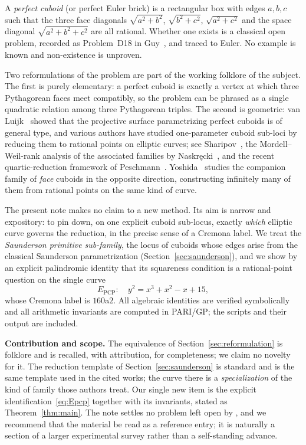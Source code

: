 \documentclass[11pt,reqno]{amsart}
\theoremstyle{plain}
\theoremstyle{definition}
\newcommand{\Epcp}{E_{\mathrm{PCP}}}
\begin{document}
A \emph{perfect cuboid} (or perfect Euler brick) is a rectangular box with
edges $a,b,c$ such that the three face diagonals $\sqrt{a^2+b^2}$,
$\sqrt{b^2+c^2}$, $\sqrt{a^2+c^2}$ and the space diagonal
$\sqrt{a^2+b^2+c^2}$ are all rational. Whether one exists is a classical open
problem, recorded as Problem~D18 in Guy~\cite{Guy}, and traced to Euler. No
example is known and non-existence is unproven.

Two reformulations of the problem are part of the working folklore of the
subject. The first is purely elementary: a perfect cuboid is exactly a vertex
at which three Pythagorean faces meet compatibly, so the problem can be phrased
as a single quadratic relation among three Pythagorean triples. The second is
geometric: van Luijk~\cite{vanLuijk} showed that the projective surface
parametrizing perfect cuboids is of general type, and various authors have
studied one-parameter cuboid sub-loci by reducing them to rational points on
elliptic curves; see Sharipov~\cite{Sharipov2elliptic}, the
Mordell--Weil-rank analysis of the associated families by
Naskr\k{e}cki~\cite{Naskrecki}, and the recent quartic-reduction framework of
Peschmann~\cite{Peschmann1,Peschmann2}. Yoshida~\cite{Yoshida} studies the
companion family of \emph{face} cuboids in the opposite direction, constructing
infinitely many of them from rational points on the same kind of curve.

The present note makes no claim to a new method. Its aim is narrow and
expository: to pin down, on one explicit cuboid sub-locus, exactly \emph{which}
elliptic curve governs the reduction, in the precise sense of a Cremona label.
We treat the \emph{Saunderson primitive sub-family}, the locus of cuboids whose
edges arise from the classical Saunderson parametrization
(Section~\ref{sec:saunderson}), and we show by an explicit palindromic identity
that its squareness condition is a rational-point question on the single curve
\begin{equation}\label{eq:Epcp}
   \Epcp\colon\quad y^2=x^3+x^2-x+15,
\end{equation}
whose Cremona label is $160$a$2$. All algebraic identities are verified
symbolically and all arithmetic invariants are computed in PARI/GP; the scripts
and their output are included.

\medskip
\noindent\textbf{Contribution and scope.}
The equivalence of Section~\ref{sec:reformulation} is folklore and is recalled,
with attribution, for completeness; we claim no novelty for it. The reduction
template of Section~\ref{sec:saunderson} is standard and is the same template
used in the cited works; the curve there is a \emph{specialization} of the kind
of family those authors treat. Our single new item is the explicit
identification~\eqref{eq:Epcp} together with its invariants, stated as
Theorem~\ref{thm:main}. The note settles no problem left open by
\cite{vanLuijk,Sharipov2elliptic,Naskrecki,Peschmann1,Peschmann2,Yoshida}, and
we recommend that the material be read as a reference entry; it is naturally a
section of a larger experimental survey rather than a self-standing advance.
\end{document}
